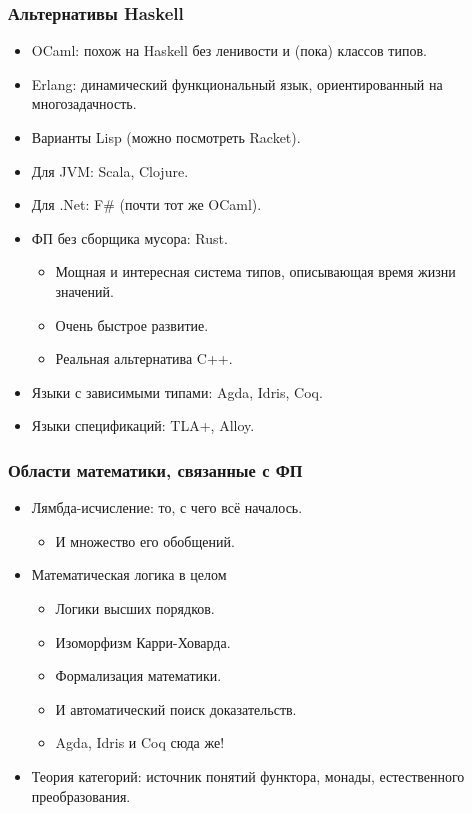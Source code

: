 \documentclass[11pt]{beamer}
\begin{document}
\begin{frame}[fragile]
\frametitle{Альтернативы Haskell}
\begin{itemize}
    \item OCaml: похож на Haskell без ленивости и (пока) классов типов.
    \item Erlang: динамический функциональный язык, ориентированный на многозадачность.
    \item Варианты Lisp (можно посмотреть Racket).
    \pause
    \item Для JVM: Scala, Clojure.
    \item Для .Net: F\# (почти тот же OCaml).
    \pause
    \item ФП без сборщика мусора: Rust.
    \begin{itemize}
        \item Мощная и интересная система типов, описывающая время жизни значений.
        \item Очень быстрое развитие.
        \item Реальная альтернатива C++.
    \end{itemize}
    \pause
    \item Языки с зависимыми типами: Agda, Idris, Coq.
    \pause
    \item Языки спецификаций: TLA+, Alloy.
\end{itemize}
\end{frame}

\begin{frame}[fragile]
\frametitle{Области математики, связанные с ФП}
\begin{itemize}
    \item Лямбда-исчисление: то, с чего всё началось.
    \begin{itemize}
        \item И множество его обобщений.
    \end{itemize}
    \pause
    \item Математическая логика в целом 
    \begin{itemize}
        \item Логики высших порядков.
        \item Изоморфизм Карри-Ховарда.
        \item Формализация математики.
        \item И автоматический поиск доказательств.
        \item Agda, Idris и Coq сюда же!
    \end{itemize}
    \pause
    \item Теория категорий: источник понятий функтора, монады, естественного преобразования.
\end{itemize}
\end{frame}
\end{document}
